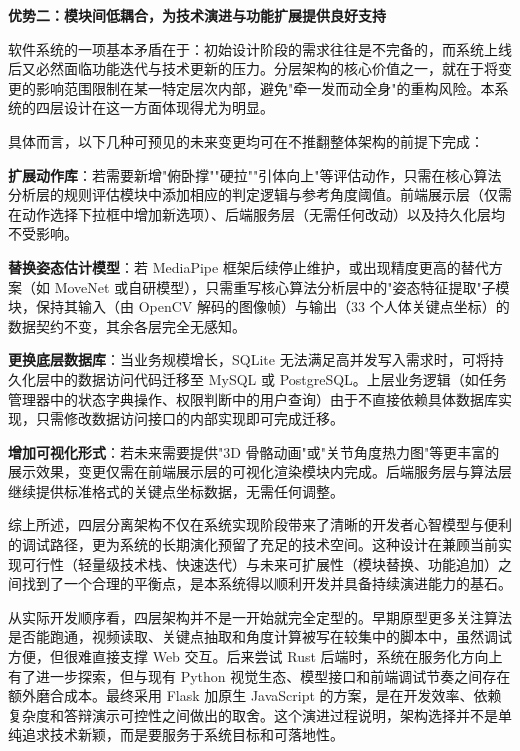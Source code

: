 \textbf{优势二：模块间低耦合，为技术演进与功能扩展提供良好支持}

软件系统的一项基本矛盾在于：初始设计阶段的需求往往是不完备的，而系统上线后又必然面临功能迭代与技术更新的压力。分层架构的核心价值之一，就在于将变更的影响范围限制在某一特定层次内部，避免"牵一发而动全身"的重构风险。本系统的四层设计在这一方面体现得尤为明显。

具体而言，以下几种可预见的未来变更均可在不推翻整体架构的前提下完成：

\begin{chineseenum}
  \item \textbf{扩展动作库}：若需要新增"俯卧撑""硬拉""引体向上"等评估动作，只需在核心算法分析层的规则评估模块中添加相应的判定逻辑与参考角度阈值。前端展示层（仅需在动作选择下拉框中增加新选项）、后端服务层（无需任何改动）以及持久化层均不受影响。

  \item \textbf{替换姿态估计模型}：若 MediaPipe 框架后续停止维护，或出现精度更高的替代方案（如 MoveNet 或自研模型），只需重写核心算法分析层中的"姿态特征提取"子模块，保持其输入（由 OpenCV 解码的图像帧）与输出（33 个人体关键点坐标）的数据契约不变，其余各层完全无感知。

  \item \textbf{更换底层数据库}：当业务规模增长，SQLite 无法满足高并发写入需求时，可将持久化层中的数据访问代码迁移至 MySQL 或 PostgreSQL。上层业务逻辑（如任务管理器中的状态字典操作、权限判断中的用户查询）由于不直接依赖具体数据库实现，只需修改数据访问接口的内部实现即可完成迁移。

  \item \textbf{增加可视化形式}：若未来需要提供"3D 骨骼动画"或"关节角度热力图"等更丰富的展示效果，变更仅需在前端展示层的可视化渲染模块内完成。后端服务层与算法层继续提供标准格式的关键点坐标数据，无需任何调整。
\end{chineseenum}

综上所述，四层分离架构不仅在系统实现阶段带来了清晰的开发者心智模型与便利的调试路径，更为系统的长期演化预留了充足的技术空间。这种设计在兼顾当前实现可行性（轻量级技术栈、快速迭代）与未来可扩展性（模块替换、功能追加）之间找到了一个合理的平衡点，是本系统得以顺利开发并具备持续演进能力的基石。

从实际开发顺序看，四层架构并不是一开始就完全定型的。早期原型更多关注算法是否能跑通，视频读取、关键点抽取和角度计算被写在较集中的脚本中，虽然调试方便，但很难直接支撑 Web 交互。后来尝试 Rust 后端时，系统在服务化方向上有了进一步探索，但与现有 Python 视觉生态、模型接口和前端调试节奏之间存在额外磨合成本。最终采用 Flask 加原生 JavaScript 的方案，是在开发效率、依赖复杂度和答辩演示可控性之间做出的取舍。这个演进过程说明，架构选择并不是单纯追求技术新颖，而是要服务于系统目标和可落地性。

